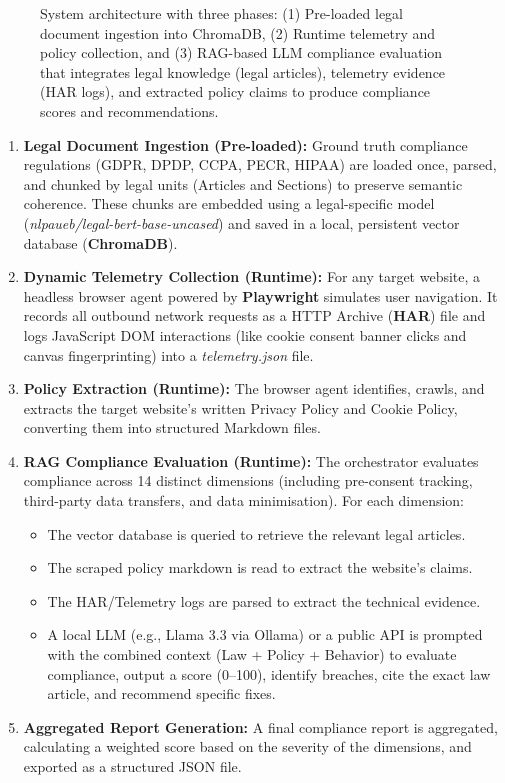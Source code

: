 \documentclass[11pt,a4paper]{article}
\begin{document}
\begin{figure}[h]
\begin{tikzpicture}
\end{tikzpicture}
\caption{System architecture with three phases: (1) Pre-loaded legal document ingestion into ChromaDB, (2) Runtime telemetry and policy collection, and (3) RAG-based LLM compliance evaluation that integrates legal knowledge (legal articles), telemetry evidence (HAR logs), and extracted policy claims to produce compliance scores and recommendations.}
\label{fig:architecture}
\end{figure}

\begin{enumerate}
    \item \textbf{Legal Document Ingestion (Pre-loaded):} Ground truth compliance regulations (GDPR, DPDP, CCPA, PECR, HIPAA) are loaded once, parsed, and chunked by legal units (Articles and Sections) to preserve semantic coherence. These chunks are embedded using a legal-specific model (\textsl{nlpaueb/legal-bert-base-uncased}) and saved in a local, persistent vector database (\textbf{ChromaDB}).
    \item \textbf{Dynamic Telemetry Collection (Runtime):} For any target website, a headless browser agent powered by \textbf{Playwright} simulates user navigation. It records all outbound network requests as a HTTP Archive (\textbf{HAR}) file and logs JavaScript DOM interactions (like cookie consent banner clicks and canvas fingerprinting) into a \textsl{telemetry.json} file.
    \item \textbf{Policy Extraction (Runtime):} The browser agent identifies, crawls, and extracts the target website's written Privacy Policy and Cookie Policy, converting them into structured Markdown files.
    \item \textbf{RAG Compliance Evaluation (Runtime):} The orchestrator evaluates compliance across 14 distinct dimensions (including pre-consent tracking, third-party data transfers, and data minimisation). For each dimension:
    \begin{itemize}
        \item The vector database is queried to retrieve the relevant legal articles.
        \item The scraped policy markdown is read to extract the website's claims.
        \item The HAR/Telemetry logs are parsed to extract the technical evidence.
        \item A local LLM (e.g., Llama 3.3 via Ollama) or a public API is prompted with the combined context (Law + Policy + Behavior) to evaluate compliance, output a score (0--100), identify breaches, cite the exact law article, and recommend specific fixes.
    \end{itemize}
    \item \textbf{Aggregated Report Generation:} A final compliance report is aggregated, calculating a weighted score based on the severity of the dimensions, and exported as a structured JSON file.
\end{enumerate}
\end{document}
